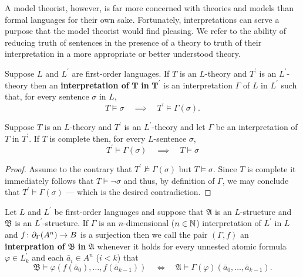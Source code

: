 A model theorist, however, is far more concerned with theories and models than formal languages for their own sake.  Fortunately, interpretations can serve a purpose that the model theorist would find pleasing.  We refer to the ability of reducing truth of sentences in the presence of a theory to truth of their interpretation in a more appropriate or better understood theory.

\begin{dfn}
	Suppose $L$ and $L^\prime$ are first-order languages.  If $T$ is an $L$-theory and $T^\prime$ is an $L^\prime$-theory then an \textbf{interpretation of }$\bm{T}$\textbf{ in }$\bm{T^\prime}$ is an interpretation $\Gamma$ of $L$ in $L^\prime$ such that, for every sentence $\sigma$ in $L$,
	\begin{equation}
		T\models\sigma\quad\implies\quad T^\prime\models\Gamma(\sigma).
	\end{equation}
\end{dfn}

\begin{prp}
	Suppose $T$ is an $L$-theory and $T^\prime$ is an $L^\prime$-theory and let $\Gamma$ be an interpretation of $T$ in $T^\prime$.  If $T$ is complete then, for every $L$-sentence $\sigma$,
	\begin{equation}
		T^\prime\models\Gamma(\sigma)\quad\implies\quad T\models\sigma
	\end{equation}
\end{prp}
\begin{proof}
	Assume to the contrary that $T^\prime\not\models\Gamma(\sigma)$ but $T\models\sigma$.  Since $T$ is complete it immediately follows that $T\models\neg\sigma$ and thus, by definition of $\Gamma$, we may conclude that $T^\prime\models\Gamma(\sigma)$ --- which is the desired contradiction.
\end{proof}

\begin{dfn}
	Let $L$ and $L^\prime$ be first-order languages and suppose that $\mathfrak{A}$ is an $L$-structure and $\mathfrak{B}$ is an $L^\prime$-structure.  If $\Gamma$ is an $n$-dimensional ($n\in\mathbb{N}$) interpretation of $L^\prime$ in $L$ and $f\colon\partial_\Gamma(A^n)\to B$ is a surjection then we call the pair $(\Gamma,f)$ an \textbf{interpration of }$\bm{\mathfrak{B}}$\textbf{ in }$\bm{\mathfrak{A}}$ whenever it holds for every unnested atomic formula $\varphi\in L^\prime_k$ and each $\bar{a}_i\in A^n$ ($i<k$) that
	\begin{equation}
		\mathfrak{B}\models\varphi(f(\bar{a}_0),\dotsc,f(\bar{a}_{k-1}))\quad\iff\quad\mathfrak{A}\models\Gamma(\varphi)(\bar{a}_0,\dotsc,\bar{a}_{k-1}).
	\end{equation}
\end{dfn}

